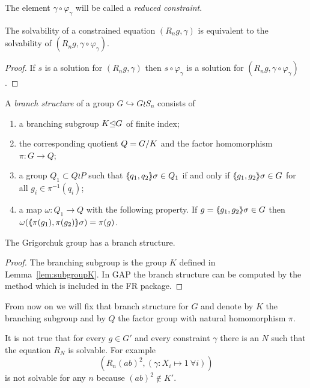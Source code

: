 \documentclass[a4paper,11pt]{amsart}
\begin{document}
 The element $\gamma \circ \varphi_\gamma$ will be called a \emph{reduced constraint}.

\begin{lem} \label{lem:solvabilityWithReducedConstraint}
 The solvability of a constrained equation $(R_n g,\gamma)$ is equivalent to the solvability of $(R_n g,\gamma\circ \varphi_\gamma)$.
\end{lem}
 \begin{proof}
 If $s$ is a solution for $(R_n g,\gamma)$ then $s\circ \varphi_\gamma$ is
 a solution for $(R_n g,\gamma\circ \varphi_\gamma)$. 
\end{proof}


\begin{defi} 
A \emph{branch structure} of a group $G\hookrightarrow G \wr S_n$ consists of  
\begin{enumerate}
 \item a branching subgroup $K{\mathrel\trianglelefteq} G$ of finite index;
 \item the corresponding quotient $Q={G/K}$ and the factor homomorphism $\pi\colon G \to Q$;
 \item a group $Q_1 \subset Q \wr P$ such that $\langle\negthickspace\langle q_1,q_2\rangle\negthickspace\rangle\sigma\in Q_1$ if and only if $\langle\negthickspace\langle g_1,g_2\rangle\negthickspace\rangle\sigma \in G$ for all $g_i \in \pi^{-1}(q_i)$;
 \item a map $\omega\colon Q_1 \to Q$ with the following property. If $g=\langle\negthickspace\langle g_1,g_2\rangle\negthickspace\rangle\sigma \in G$ then $\omega(\langle\negthickspace\langle\pi(g_1),\pi(g_2)\rangle\negthickspace\rangle\sigma) = \pi(g)$.
\end{enumerate}
\end{defi}
\begin{lem}
 The Grigorchuk group has a branch structure.
\end{lem}
\begin{proof}
 The branching subgroup is the group $K$ defined in Lemma~\ref{lem:subgroupK}. In GAP the branch structure can be computed
 by the method  which is included in the FR package. 
\end{proof}
From now on we will fix that branch structure for $G$ and denote by $K$ the branching subgroup and by $Q$ the factor group with natural homomorphism $\pi$.

\begin{re}
 It is not true that for every $g\in G'$ and every constraint $\gamma$ 
 there is an $N$ such that the equation $R_N$ is solvable. For example 
 \[\left(R_n(ab)^2,(\gamma\colon X_i\mapsto 1\ \forall i)\right)\] 
 is not solvable for any $n$ because $(ab)^2\notin K'$.
\end{re}
\end{document}
